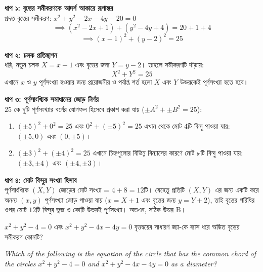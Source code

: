 \documentclass[12pt, a4paper]{article}
\begin{document}
\begin{tcolorbox}[solutionbox={সমাধান (Solution)}]
    \noindent
    \textbf{ধাপ ১: বৃত্তের সমীকরণকে আদর্শ আকারে রূপান্তর} \\
    প্রদত্ত বৃত্তের সমীকরণ: $x^2 + y^2 - 2x - 4y - 20 = 0$
    \[ \implies (x^2 - 2x + 1) + (y^2 - 4y + 4) = 20 + 1 + 4 \]
    \[ \implies (x - 1)^2 + (y - 2)^2 = 25 \]
    
    \vspace{0.5em}
    \noindent\textbf{ধাপ ২: চলক প্রতিস্থাপন} \\
    ধরি, নতুন চলক $X = x - 1$ এবং বৃত্তের জন্য $Y = y - 2$। 
    তাহলে সমীকরণটি দাঁড়ায়:
    \[ X^2 + Y^2 = 25 \]
    এখানে $x$ ও $y$ পূর্ণসংখ্যা হওয়ার জন্য প্রয়োজনীয় ও পর্যাপ্ত শর্ত হলো $X$ এবং $Y$ উভয়কেই পূর্ণসংখ্যা হতে হবে।
    
    \vspace{0.5em}
    \noindent\textbf{ধাপ ৩: পূর্ণসাংখ্যিক সমাধানের জোড় নির্ণয়} \\
    $25$ কে দুটি পূর্ণসংখ্যার বর্গের যোগফল হিসেবে প্রকাশ করা যায় ($\pm A^2 + \pm B^2 = 25$):
    \begin{enumerate}
        \item $(\pm 5)^2 + 0^2 = 25$ এবং $0^2 + (\pm 5)^2 = 25$ 
        এখান থেকে মোট $4$টি বিন্দু পাওয়া যায়: $(\pm 5, 0)$ এবং $(0, \pm 5)$।
        \item $(\pm 3)^2 + (\pm 4)^2 = 25$ 
        এখানে চিহ্নগুলোর বিভিন্ন বিন্যাসের কারণে মোট ৮টি বিন্দু পাওয়া যায়: $(\pm 3, \pm 4)$ এবং $(\pm 4, \pm 3)$।
    \end{enumerate}
    
    \vspace{0.5em}
    \noindent\textbf{ধাপ ৪: মোট বিন্দুর সংখ্যা হিসাব} \\
    পূর্ণসাংখ্যিক $(X, Y)$ জোড়ের মোট সংখ্যা = $4 + 8 = 12$টি। 
    যেহেতু প্রতিটি $(X, Y)$ এর জন্য একটি করে অনন্য $(x, y)$ পূর্ণসংখ্যা জোড় পাওয়া যায় ($x = X + 1$ এবং বৃত্তের জন্য $y = Y + 2$), তাই বৃত্তের পরিধির ওপর মোট $12$টি বিন্দুর ভুজ ও কোটি উভয়ই পূর্ণসংখ্যা।
    অতএব, সঠিক উত্তর B।
\end{tcolorbox}
\begin{tcolorbox}[questionbox={প্রশ্ন (Question) 12}]
    \noindent
    $x^2 + y^2 - 4 = 0$ এবং $x^2 + y^2 - 4x - 4y = 0$ বৃত্তদ্বয়ের সাধারণ জ্যা-কে ব্যাস ধরে অঙ্কিত বৃত্তের সমীকরণ কোনটি?
    
    \vspace{0.8em}
    \begin{english}
    \noindent\textit{\color{darkgray}
    Which of the following is the equation of the circle that has the common chord of the circles $x^2 + y^2 - 4 = 0$ and $x^2 + y^2 - 4x - 4y = 0$ as a diameter?
    }
    \end{english}
\end{tcolorbox}
\end{document}
